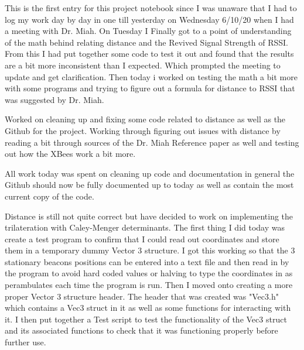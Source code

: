 \documentclass[fontsize=11pt, %
                             paper=letter, %
                             twoside, %
                             captions=tableheading,
                             index=totoc,
                             hyperref]{labbook}
\begin{document}
\begin{addmargin}[0cm]{0cm}
This is the first entry for this project notebook since I was unaware that I had to log my work day by day in one till yesterday on Wednesday 6/10/20 when I had a meeting with Dr. Miah.
\bigbreak\noindent
On Tuesday I Finally got to a point of understanding of the math behind relating distance and the Revived Signal Strength of RSSI.  From this I had put together some code to test it out and found that the results are a bit more inconsistent than I expected. Which prompted the meeting to update and get clarification. Then today i worked on testing the math a bit more with some programs and trying to figure out a formula for distance to RSSI that was suggested by Dr. Miah.

Worked on cleaning up and fixing some code related to distance as well as the Github for the project.  Working through figuring out issues with distance by reading a bit through sources of the Dr. Miah Reference paper as well and testing out how the XBees work a bit more.

All work today was spent on cleaning up code and documentation in general the Github should now be fully documented up to today as well as contain the most current copy of the code.

Distance is still not quite correct but have decided to work on implementing the trilateration with Caley-Menger determinants.  The first thing I did today was create a test program to confirm that I could read out coordinates and store them in a temporary dummy Vector 3 structure. I got this working so that the 3 stationary beacons positions can be entered into a text file and then read in by the program to avoid hard coded values or halving to type the coordinates in as perambulates each time the program is run.  Then I moved onto creating a more proper Vector 3 structure header. The header that was created was "Vec3.h" which contains a Vec3 struct in it as well as some functions for interacting with it. I then put together a Test script to test the functionality of the Vec3 struct and its associated functions to check that it was functioning properly before further use.


\end{addmargin}
\end{document}
